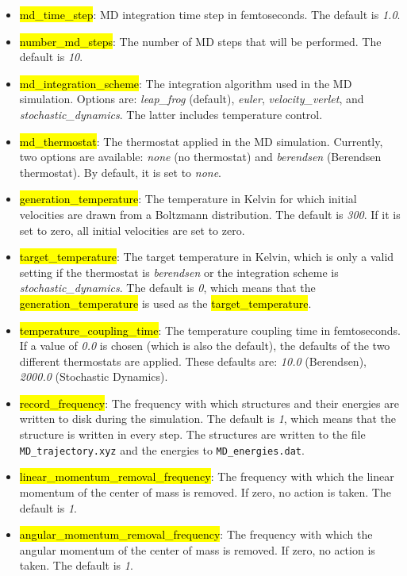 \documentclass[]{tufte-book}
\begin{document}
{{\begin{itemize}
\item \hl{md\_time\_step}: MD integration time step in femtoseconds. The default is \textit{1.0}.
\item \hl{number\_md\_steps}: The number of MD steps that will be performed. The default is \textit{10}.
\item \hl{md\_integration\_scheme}: The integration algorithm used in the MD simulation. Options are: \textit{leap\_frog} (default), \textit{euler}, \textit{velocity\_verlet}, and \textit{stochastic\_dynamics}. The latter\cite{goga12} includes temperature control.
\item \hl{md\_thermostat}: The thermostat applied in the MD simulation. Currently, two options are available: \textit{none} (no thermostat) and \textit{berendsen} (Berendsen thermostat\cite{berendsen84}). By default, it is set to \textit{none}.
\item \hl{generation\_temperature}: The temperature in Kelvin for which initial velocities are drawn from a Boltzmann distribution. The default is \textit{300}. If it is set to zero, all initial velocities are set to zero.
\item \hl{target\_temperature}: The target temperature in Kelvin, which is only a valid setting if the thermostat is \textit{berendsen} or the integration scheme is \textit{stochastic\_dynamics}. The default is \textit{0}, which means that the \hl{generation\_temperature} is used as the \hl{target\_temperature}.
\item \hl{temperature\_coupling\_time}: The temperature coupling time in femtoseconds. If a value of \textit{0.0} is chosen (which is also the default), the defaults of the two different thermostats are applied. These defaults are: \textit{10.0} (Berendsen), \textit{2000.0} (Stochastic Dynamics).
\item \hl{record\_frequency}: The frequency with which structures and their energies are written to disk during the simulation. The default is \textit{1}, which means that the structure is written in every step. The structures are written to the file \texttt{MD\_trajectory.xyz} and the energies to \texttt{MD\_energies.dat}.
\item \hl{linear\_momentum\_removal\_frequency}: The frequency with which the linear momentum of the center of mass is removed. If zero, no action is taken. The default is \textit{1}.
\item \hl{angular\_momentum\_removal\_frequency}: The frequency with which the angular momentum of the center of mass is removed. If zero, no action is taken. The default is \textit{1}.
\end{itemize}

}}
\end{document}
